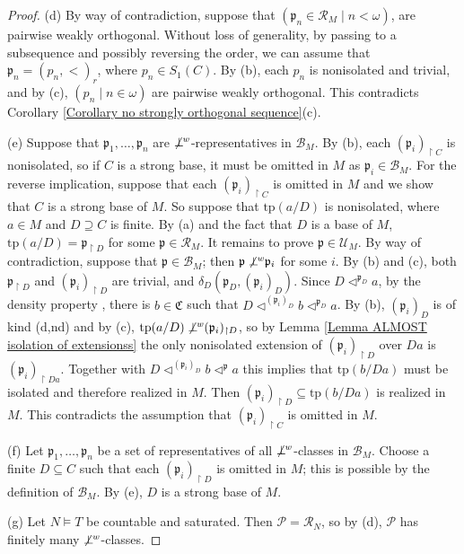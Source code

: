 \documentclass{amsart}
\theoremstyle{definition}
\theoremstyle{definition}
\def\strok{\restriction}
\newcommand{\nwor}{\not\perp\hspace*{-0.4em}^{\mathit w}}
\newcommand{\Mon}{\mathfrak C}
\newcommand{\tp}{\mathrm{tp}}
\begin{document}
\begin{proof}
(d) By way of contradiction, suppose that $(\mathfrak p_n\in\mathcal R_M\mid n<\omega)$, are pairwise weakly orthogonal. Without loss of generality, by passing to a subsequence and possibly reversing the order, we can assume that $\mathfrak p_n=(p_n,<)_r$, where $p_n\in S_1(C)$.  
By (b), each $p_n$ is nonisolated and trivial, and by (c), $(p_n\mid n\in\omega)$ are pairwise weakly orthogonal. This contradicts Corollary \ref{Corollary no strongly orthogonal sequence}(c).

(e) Suppose that $\mathfrak p_1,\dots,\mathfrak p_n$ are $\nwor$-representatives in $\mathcal B_M$. By (b), each $(\mathfrak p_i)_{\strok C}$ is nonisolated, so if $C$ is a strong base, it must be omitted in $M$ as $\mathfrak p_i\in\mathcal B_M$. 
For the reverse implication, suppose that each $(\mathfrak p_i)_{\strok C}$ is omitted in $M$ and we show that $C$ is a strong base of $M$. So suppose that $\tp(a/D)$ is nonisolated, where $a\in M$ and $D\supseteq C$ is finite. By (a) and the fact that $D$ is a base of $M$, $\tp(a/D)=\mathfrak p_{\strok D}$ for some $\mathfrak p\in\mathcal R_M$. 
It remains to prove $\mathfrak p\in \mathcal U_M$. By way of contradiction, suppose that $\mathfrak p\in \mathcal B_M$; then $\mathfrak p\nwor \mathfrak p_i$ for some $i$. By (b) and (c), both $\mathfrak p_{\strok D}$ and $(\mathfrak p_i)_{\strok D}$ are trivial, and $\delta_D(\mathfrak p_D,(\mathfrak p_i)_D)$. Since $D\triangleleft^{\mathfrak p_D}a$, by the density property \cite[Corollary 2.13(b)]{MTwqom1}, there is $b\in\Mon$ such that $D\triangleleft^{(\mathfrak p_i)_D}b \triangleleft^{\mathfrak p_D}a$. By (b), $(\mathfrak p_i)_D$ is of kind (d,nd) and by (c), $\tp(a/D)\nwor(\mathfrak p_i)_{\strok D}$, so by Lemma \ref{Lemma ALMOST isolation of extensionss} the only nonisolated extension of $(\mathfrak p_i)_{\strok D}$ over $Da$ is $(\mathfrak p_i)_{\strok Da}$. Together with $D\triangleleft^{(\mathfrak p_i)_D}b \triangleleft^{\mathfrak p}a$ this implies that $\tp(b/Da)$ must be isolated and therefore realized in $M$. Then $(\mathfrak p_i)_{\strok D}\subseteq \tp(b/Da)$ is realized in $M$. This contradicts the assumption that $(\mathfrak p_i)_{\strok C}$ is omitted in $M$.

(f) Let $\mathfrak p_1,\dots,\mathfrak p_n$ be a set of representatives of all $\nwor$-classes in $\mathcal B_M$. Choose a finite $D\subseteq C$ such that each $(\mathfrak p_i)_{\strok D}$ is omitted in $M$; this is possible by the definition of $\mathcal B_M$. By (e), $D$ is a strong base of $M$. 

(g) Let $N\models T$ be countable and saturated. Then $\mathcal P=\mathcal R_N$, so by (d), $\mathcal P$ has finitely many $\nwor$-classes.
\end{proof}
\end{document}
